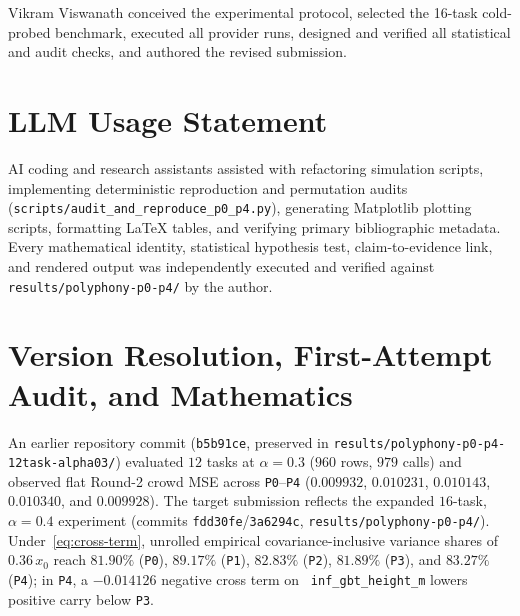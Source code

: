 \documentclass[11pt,letterpaper]{article}
\theoremstyle{plain}
\newcommand{\code}[1]{\nolinkurl{#1}}
\newcommand{\taskid}[1]{\texttt{\small\hyphenpenalty=50 #1}}
\begin{document}
Vikram Viswanath conceived the experimental protocol, selected the 16-task cold-probed benchmark, executed all provider runs, designed and verified all statistical and audit checks, and authored the revised submission.

\section{LLM Usage Statement}

AI coding and research assistants assisted with refactoring simulation scripts, implementing deterministic reproduction and permutation audits (\code{scripts/audit\_and\_reproduce\_p0\_p4.py}), generating Matplotlib plotting scripts, formatting \LaTeX{} tables, and verifying primary bibliographic metadata. Every mathematical identity, statistical hypothesis test, claim-to-evidence link, and rendered output was independently executed and verified against \code{results/polyphony-p0-p4/} by the author.

\clearpage

\small

\normalsize

\clearpage
\appendix

\section{Version Resolution, First-Attempt Audit, and Mathematics}\label{app:audit}

An earlier repository commit (\texttt{b5b91ce}, preserved in \code{results/polyphony-p0-p4-12task-alpha03/}) evaluated $12$ tasks at $\alpha=0.3$ ($960$ rows, $979$ calls) and observed flat Round-2 crowd MSE across \texttt{P0}--\texttt{P4} ($0.009932$, $0.010231$, $0.010143$, $0.010340$, and $0.009928$). The target submission reflects the expanded $16$-task, $\alpha=0.4$ experiment (commits \texttt{fdd30fe}/\texttt{3a6294c}, \code{results/polyphony-p0-p4/}). Under~\eqref{eq:cross-term}, unrolled empirical covariance-inclusive variance shares of $0.36\,x_0$ reach $81.90\%$ (\texttt{P0}), $89.17\%$ (\texttt{P1}), $82.83\%$ (\texttt{P2}), $81.89\%$ (\texttt{P3}), and $83.27\%$ (\texttt{P4}); in \texttt{P4}, a $-0.014126$ negative cross term on \taskid{inf\_gbt\_height\_m} lowers positive carry below \texttt{P3}.
\end{document}
